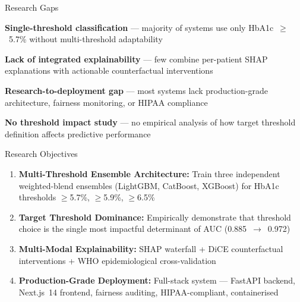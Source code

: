 \documentclass[aspectratio=169, 11pt]{beamer}
\begin{document}
\begin{frame}{Research Gaps}
  \small
  \vspace{0.1cm}
  \begin{description}
    \setlength{\itemsep}{10pt}
    \item[\textcolor{accent1}{Gap 1:}] \textbf{Single-threshold classification} --- majority of systems use only HbA1c~$\geq$~5.7\% without multi-threshold adaptability
    \item[\textcolor{accent1}{Gap 2:}] \textbf{Lack of integrated explainability} --- few combine per-patient SHAP explanations with actionable counterfactual interventions
    \item[\textcolor{accent1}{Gap 3:}] \textbf{Research-to-deployment gap} --- most systems lack production-grade architecture, fairness monitoring, or HIPAA compliance
    \item[\textcolor{accent1}{Gap 4:}] \textbf{No threshold impact study} --- no empirical analysis of how target threshold definition affects predictive performance
  \end{description}
\end{frame}

\begin{frame}{Research Objectives}
  \small
  \vspace{0.1cm}
  \begin{enumerate}
    \setlength{\itemsep}{7pt}
    \item \textbf{Multi-Threshold Ensemble Architecture:} Train three independent weighted-blend ensembles (LightGBM, CatBoost, XGBoost) for HbA1c thresholds $\geq$5.7\%, $\geq$5.9\%, $\geq$6.5\%
    \item \textbf{Target Threshold Dominance:} Empirically demonstrate that threshold choice is the single most impactful determinant of AUC (0.885~$\to$~0.972)
    \item \textbf{Multi-Modal Explainability:} SHAP waterfall + DiCE counterfactual interventions + WHO epidemiological cross-validation
    \item \textbf{Production-Grade Deployment:} Full-stack system --- FastAPI backend, Next.js~14 frontend, fairness auditing, HIPAA-compliant, containerised
  \end{enumerate}
\end{frame}
\end{document}
